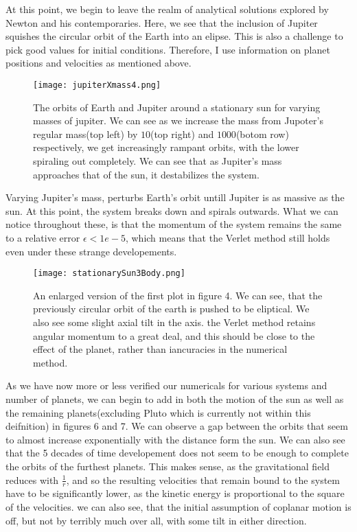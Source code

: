 \documentclass[10pt, twocolumn]{revtex4-1}
\begin{document}
At this point, we begin to leave the realm of analytical solutions explored by Newton and his contemporaries. Here, we see that 
the inclusion of Jupiter squishes the circular orbit of the Earth into an elipse. This is also a challenge to pick good values for 
initial conditions. Therefore, I use information on planet positions and velocities\cite{MathiasPlanetvalues} as mentioned above. 
\begin{figure}[hbtp]
    \texttt{[image: jupiterXmass4.png]}
    \caption{The orbits of Earth and Jupiter around a stationary sun for varying masses of jupiter. We can see 
    as we increase the mass from Jupoter's regular mass(top left) by $10$(top right) and $1 000$(botom row) 
    respectively, we get increasingly rampant orbits, with the lower spiraling out completely. We can see that as
    Jupiter's mass approaches that of the sun, it destabilizes the system. }
    \label{}
\end{figure}
Varying Jupiter's mass, perturbs Earth's orbit untill Jupiter is as massive as the sun. At this point, the system breaks down and spirals outwards. 
What we can notice throughout these, is that the momentum of the system remains the same to a relative error $\epsilon < 1e-5$, which means that 
the Verlet method still holds even under these strange developements. 

\begin{figure}[hbtp]
    \texttt{[image: stationarySun3Body.png]}
    \caption{An enlarged version of the first plot in figure 4. We can see, that the previously circular orbit of
        the earth is pushed to be eliptical. We also see some slight axial tilt in the axis. the Verlet method retains
        angular momentum to a great deal, and this should be close to the effect of the planet, rather than iancuracies 
        in the numerical method.}
    \label{}
\end{figure}


As we have now more or less verified our numericals for various systems and number of planets, we can begin to add in both the motion 
of the sun as well as the remaining planets(excluding Pluto which is currently not within this deifnition) in figures 6 and 7. We can observe a gap between
the orbits that seem to almost increase exponentially with the distance form the sun. We can also see that the 5 decades of time developement 
does not seem to be enough to complete the orbits of the furthest planets. This makes sense, as the gravitational field reduces with 
$\frac{1}{r}$, and so the resulting velocities that remain bound to the system have to be significantly lower, as the kinetic energy is 
proportional to the square of the velocities. we can also see, that the initial assumption of coplanar motion is off, but not by terribly 
much over all, with some tilt in either direction. 
\end{document}
